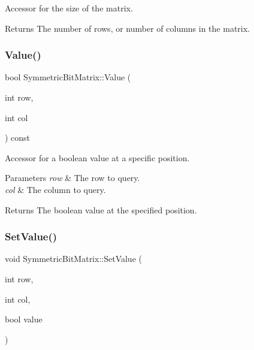 Accessor for the size of the matrix. 

\begin{DoxyReturn}{Returns}
The number of rows, or number of columns in the matrix. 
\end{DoxyReturn}
\mbox{\label{class_symmetric_bit_matrix_a02221e8620c41734a56ec329da1b66c6}} 
\subsubsection{\texorpdfstring{Value()}{Value()}}
{\footnotesize\ttfamily bool Symmetric\+Bit\+Matrix\+::\+Value (\begin{DoxyParamCaption}\item[{int}]{row,  }\item[{int}]{col }\end{DoxyParamCaption}) const\hspace{0.3cm}{\ttfamily [inline]}}



Accessor for a boolean value at a specific position. 


\begin{DoxyParams}{Parameters}
{\em row} & The row to query. \\
\hline
{\em col} & The column to query. \\
\hline
\end{DoxyParams}
\begin{DoxyReturn}{Returns}
The boolean value at the specified position. 
\end{DoxyReturn}
\mbox{\label{class_symmetric_bit_matrix_a5d97dfec2cf3910b2f46b80307528c43}} 
\subsubsection{\texorpdfstring{Set\+Value()}{SetValue()}}
{\footnotesize\ttfamily void Symmetric\+Bit\+Matrix\+::\+Set\+Value (\begin{DoxyParamCaption}\item[{int}]{row,  }\item[{int}]{col,  }\item[{bool}]{value }\end{DoxyParamCaption})\hspace{0.3cm}{\ttfamily [inline]}}



